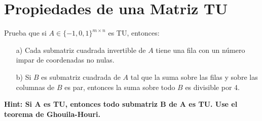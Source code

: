 \documentclass[10pt]{article}
\theoremstyle{plain}
\theoremstyle{definition}
\begin{document}
\section{Propiedades de una Matriz TU}
Prueba que si $A\in\{-1,0,1\}^{m\times n}$ es TU, entonces:
\begin{itemize}
    \item[a)] Cada submatriz cuadrada invertible de $A$ tiene una fila con un número impar de coordenadas no nulas.
    \item[b)] Si $B$ es submatriz cuadrada de $A$ tal que la suma sobre las filas y sobre las columnas de $B$ es par, entonces la suma sobre todo $B$ es divisible por 4.
\end{itemize}
\textbf{Hint: Si A es TU, entonces todo submatriz B de A es TU. Use el teorema de Ghouila-Houri.}
\end{document}
